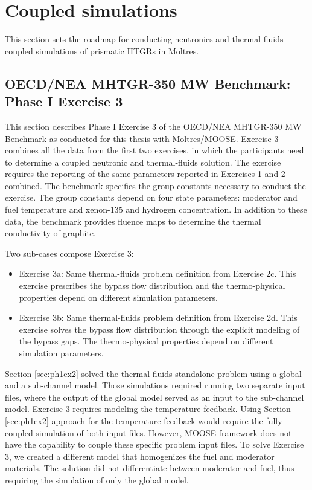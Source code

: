 \section{Coupled simulations}
\label{sec:thermal-coupling}

This section sets the roadmap for conducting neutronics and thermal-fluids coupled simulations of prismatic HTGRs in Moltres.

\subsection{OECD/NEA MHTGR-350 MW Benchmark: Phase I Exercise 3}
\label{sec:ph1ex3}

This section describes Phase I Exercise 3 of the OECD/NEA MHTGR-350 MW Benchmark as conducted for this thesis with Moltres/MOOSE.
Exercise 3 combines all the data from the first two exercises, in which the participants need to determine a coupled neutronic and thermal-fluids solution.
The exercise requires the reporting of the same parameters reported in Exercises 1 and 2 combined.
The benchmark specifies the group constants necessary to conduct the exercise.
The group constants depend on four state parameters: moderator and fuel temperature and xenon-135 and hydrogen concentration.
In addition to these data, the benchmark provides fluence maps to determine the thermal conductivity of graphite.

Two sub-cases compose Exercise 3:
\begin{itemize}
  \item Exercise 3a: Same thermal-fluids problem definition from Exercise 2c. This exercise prescribes the bypass flow distribution and the thermo-physical properties depend on different simulation parameters.
  \item Exercise 3b: Same thermal-fluids problem definition from Exercise 2d. This exercise solves the bypass flow distribution through the explicit modeling of the bypass gaps. The thermo-physical properties depend on different simulation parameters.
\end{itemize}

Section \ref{sec:ph1ex2} solved the thermal-fluids standalone problem using a global and a sub-channel model.
Those simulations required running two separate input files, where the output of the global model served as an input to the sub-channel model.
Exercise 3 requires modeling the temperature feedback.
Using Section \ref{sec:ph1ex2} approach for the temperature feedback would require the fully-coupled simulation of both input files.
However, MOOSE framework does not have the capability to couple these specific problem input files.
To solve Exercise 3, we created a different model that homogenizes the fuel and moderator materials.
The solution did not differentiate between moderator and fuel, thus requiring the simulation of only the global model.

